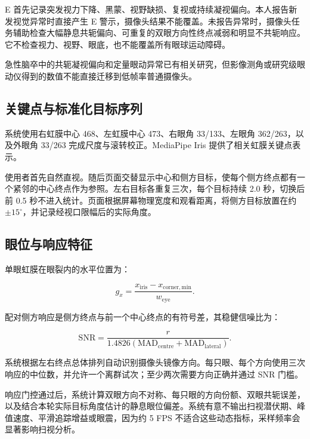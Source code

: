 \documentclass[11pt,a4paper]{article}
\begin{document}
E 首先记录突发视力下降、黑蒙、视野缺损、复视或持续凝视偏向。本人报告新发视觉异常时直接产生 E 警示，摄像头结果不能覆盖。未报告异常时，摄像头任务辅助检查大幅静息共轭偏向、可重复的双眼方向性终点减弱和明显不共轭响应。它不检查视力、视野、眼底，也不能覆盖所有眼球运动障碍。

急性脑卒中的共轭凝视偏向和定量眼动异常已有相关研究\cite{singer2006gaze,kudo2021eyemovement}，但影像测角或研究级眼动仪得到的数值不能直接迁移到低帧率普通摄像头。

\subsection{关键点与标准化目标序列}

系统使用右虹膜中心 468、左虹膜中心 473、右眼角 33/133、左眼角 362/263，以及外眼角 33/263 完成尺度与滚转校正。MediaPipe Iris 提供了相关虹膜关键点表示\cite{bazarevsky2020mediapipeiris}。

使用者首先自然直视。随后页面交替显示中心和侧方目标，使每个侧方终点都有一个紧邻的中心终点作为参照。左右目标各重复三次，每个目标持续 2.0 秒，切换后前 0.5 秒不进入统计。页面根据屏幕物理宽度和观看距离，将侧方目标放置在约 $\pm15^{\circ}$，并记录经视口限幅后的实际角度。

\subsection{眼位与响应特征}

单眼虹膜在眼裂内的水平位置为：

\begin{equation}
g_x=\frac{x_{\mathrm{iris}}-x_{\mathrm{corner,min}}}{w_{\mathrm{eye}}}.
\end{equation}

配对侧方响应是侧方终点与前一个中心终点的有符号差，其稳健信噪比为：

\begin{equation}
\mathrm{SNR}=\frac{r}{1.4826\left(\mathrm{MAD}_{\mathrm{centre}}+\mathrm{MAD}_{\mathrm{lateral}}\right)}.
\end{equation}

系统根据左右终点总体排列自动识别摄像头镜像方向。每只眼、每个方向使用三次响应的中位数，并允许一个离群试次；至少两次需要方向正确并通过 SNR 门槛。

响应门控通过后，系统计算双眼方向不对称、每只眼的方向份额、双眼共轭误差，以及结合本轮实际目标角度估计的静息眼位偏差。系统有意不输出扫视潜伏期、峰值速度、平滑追踪增益或眼震，因为约 5 FPS 不适合这些动态指标，采样频率会显著影响扫视分析\cite{bahill1975mainsequence}。
\end{document}
